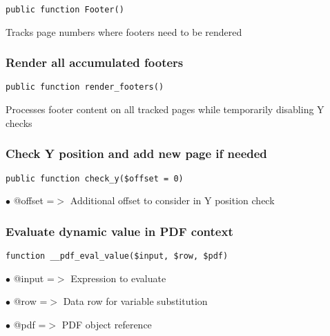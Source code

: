 \documentclass[a4paper]{article}
\begin{document}
\begin{lstlisting}
public function Footer()
\end{lstlisting}

Tracks page numbers where footers need to be rendered

\hypertarget{toc508}{}
\subsubsection{Render all accumulated footers}

\begin{lstlisting}
public function render_footers()
\end{lstlisting}

Processes footer content on all tracked pages while temporarily disabling Y checks

\hypertarget{toc509}{}
\subsubsection{Check Y position and add new page if needed}

\begin{lstlisting}
public function check_y($offset = 0)
\end{lstlisting}

\begin{compactitem}
\item[\color{myblue}$\bullet$] @offset =$>$ Additional offset to consider in Y position check
\end{compactitem}

\hypertarget{toc510}{}
\subsubsection{Evaluate dynamic value in PDF context}

\begin{lstlisting}
function __pdf_eval_value($input, $row, $pdf)
\end{lstlisting}

\begin{compactitem}
\item[\color{myblue}$\bullet$] @input =$>$ Expression to evaluate
\item[\color{myblue}$\bullet$] @row   =$>$ Data row for variable substitution
\item[\color{myblue}$\bullet$] @pdf   =$>$ PDF object reference
\end{compactitem}
\end{document}
